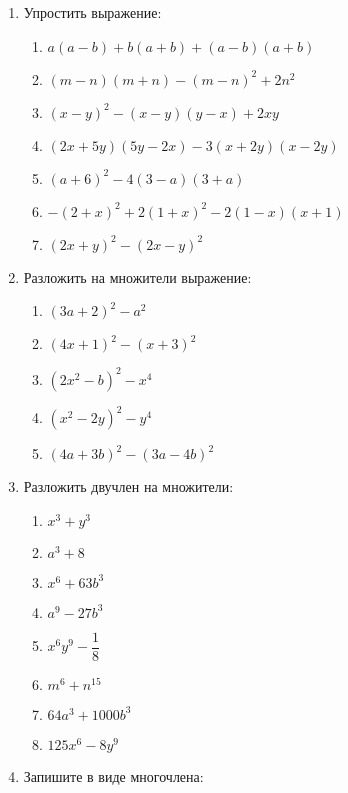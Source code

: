 \documentclass[12pt, a4paper]{article}
\begin{document}
	

\begin{enumerate}
	\item Упростить выражение:
	\begin{multicols}{2}
		\begin{enumerate}[label=\asbuk*)]
			\item $a(a-b)+b(a+b)+(a-b)(a+b)$
			\item $(m-n)(m+n)-(m-n)^2+2n^2$
			\item $(x-y)^2-(x-y)(y-x)+2xy$
			\item $(2x+5y)(5y-2x)-3(x+2y)(x-2y)$
			\item $(a+6)^2-4(3-a)(3+a)$
			\item $-(2+x)^2+2(1+x)^2-2(1-x)(x+1)$
			\item $(2x+y)^2-(2x-y)^2$
		\end{enumerate}
	\end{multicols}
	\item Разложить на множители выражение:
	\begin{multicols}{2}
		\begin{enumerate}[label=\asbuk*)]
			\item $(3a+2)^2-a^2$
			\item $(4x+1)^2-(x+3)^2$
			\item $(2x^2-b)^2-x^4$
			\item $(x^2-2y)^2-y^4$
			\item $(4a+3b)^2-(3a-4b)^2$
		\end{enumerate}
	\end{multicols}
	\item Разложить двучлен на множители:
	\begin{multicols}{4}
		\begin{enumerate}[label=\asbuk*)]
			\item $x^3+y^3$
			\item $a^3+8$
			\item $x^6+63b^3$
			\item $a^9-27b^3$
			\item $x^6y^9-\dfrac{1}{8}$
			\item $m^6+n^{15}$
			\item $64a^3+1000b^3$
			\item $125x^6-8y^9$
		\end{enumerate}
	\end{multicols}
	\item Запишите в виде многочлена:
	\begin{multicols}{2}

\end{multicols}
\end{enumerate}
\end{document}
